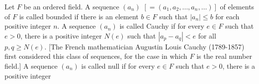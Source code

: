 Let $F$ be an ordered field. A sequence $(a_n)$ $[= (a_1, a_2, \ldots, a_n, \ldots)]$ of elements of $F$ is called bounded if there is an element $b \in F$ such that $|a_n| \leq b$ for each positive integer $n$. A sequence $(a_n)$ is called Cauchy if for every $e \in F$ such that $e > 0$, there is a positive integer $N(e)$ such that $|a_p - a_q| < e$ for all $p, q \geq N(e)$. [The French mathematician Augustin Louis Cauchy (1789-1857) first considered this class of sequences, for the case in which $F$ is the real number field.] A sequence $(a_n)$ is called null if for every $e \in F$ such that $e > 0$, there is a positive integer